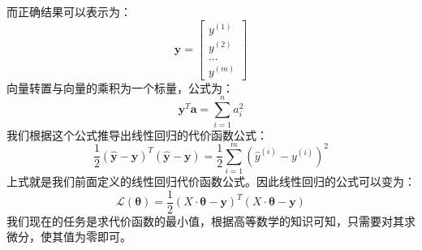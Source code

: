 \documentclass[UTF8]{article}
\begin{document}
而正确结果可以表示为：
\begin{equation}
\boldsymbol{y} = \begin{bmatrix}
y^{(1)} \\
y^{(2)} \\
... \\
y^{(m)}
\end{bmatrix}
\label{lrrn-linear-regression-formula-target-truth}
\end{equation}
向量转置与向量的乘积为一个标量，公式为：
\begin{equation}
\boldsymbol{y}^{T} \boldsymbol{a} = \sum_{i=1}^{n} a_{i}^{2}
\label{lrrn-vector-t-vector-mul}
\end{equation}
我们根据这个公式推导出线性回归的代价函数公式：
\begin{equation}
\frac{1}{2}(\hat{\boldsymbol{y}} - \boldsymbol{y} )^{T} (\hat{\boldsymbol{y}} - \boldsymbol{y} ) = \frac{1}{2}\sum_{i=1}^{m} (\hat{y}^{(i)} - y^{(i)})^{2}
\label{lrrn-derive-loss-function}
\end{equation}
上式就是我们前面定义的线性回归代价函数公式。因此线性回归的公式可以变为：
\begin{equation}
\mathcal{L}(\boldsymbol{\theta}) = \frac{1}{2}(X \cdot \boldsymbol{\theta}- \boldsymbol{y} )^{T} (X \cdot \boldsymbol{\theta} - \boldsymbol{y} )
\label{lrrn-loss-function-in-vector}
\end{equation}
我们现在的任务是求代价函数的最小值，根据高等数学的知识可知，只需要对其求微分，使其值为零即可。
\end{document}
